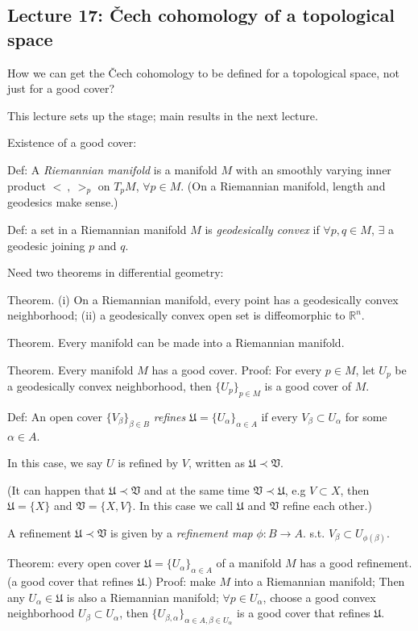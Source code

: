 \documentclass{article}
\theoremstyle{mystyle}
\theoremstyle{remark}
\numberwithin{equation}{section}
\begin{document}
\subsection{Lecture 17: Čech cohomology of a topological space}



How we can get the Čech cohomology to be defined for a topological space, not just for a good cover?

This lecture sets up the stage; main results in the next lecture.

Existence of a good cover: 

Def: 
A \emph{Riemannian manifold} is a manifold $M$ with an smoothly varying inner product $<~,~>_p$ on $T_pM$, $\forall p \in M$. (On a Riemannian manifold, length and geodesics make sense.)

Def: a set in a Riemannian manifold $M$ is \emph{geodesically convex} if $\forall p,q \in M$, $\exists$ a geodesic joining $p$ and $q$.

Need two theorems in differential geometry:

Theorem. (i) On a Riemannian manifold, every point has a geodesically convex neighborhood; (ii) a geodesically convex open set is diffeomorphic to $\mathbb{R}^n$. 

Theorem. Every manifold can be made into a Riemannian manifold.

Theorem. Every manifold $M$ has a good cover. Proof: For every $p\in M$, let $U_p$ be a geodesically convex neighborhood, then $\{U_p\}_{p\in M}$ is a good cover of $M$.

Def: An open cover $\{V_\beta\}_{\beta \in B}$ \emph{refines} $\mathfrak{U} = \{U_\alpha\}_{\alpha \in A}$ if every $V_\beta \subset U_\alpha$ for some $\alpha \in A$. 

In this case, we say $U$ is refined by $V$, written as $\mathfrak{U}\prec \mathfrak{V}$.

(It can happen that $\mathfrak{U}\prec \mathfrak{V}$ and at the same time $\mathfrak{V}\prec \mathfrak{U}$, e.g $V\subset X$, then $\mathfrak{U} = \{X\}$ and $\mathfrak{V} = \{X,V\}$. In this case we call $\mathfrak{U}$ and $\mathfrak{V}$ refine each other.)

A refinement $\mathfrak{U}\prec \mathfrak{V}$ is given by a \emph{refinement map} $\phi\colon B\rightarrow A$. s.t. $V_\beta \subset U_{\phi(\beta)}$. 

Theorem: every open cover $\mathfrak{U}=\{U_\alpha\}_{\alpha \in A}$ of a manifold $M$ has a good refinement. (a good cover that refines $\mathfrak{U}$.) Proof: make $M$ into a Riemannian manifold; Then any $U_\alpha \in \mathfrak{U}$ is also a Riemannian manifold; $\forall p \in U_\alpha$, choose a good convex neighborhood $U_\beta \subset U_\alpha$, then $\{U_{\beta,\alpha}\}_{\alpha \in A,\beta \in U_\alpha}$ is a good cover that refines $\mathfrak{U}$.  
\end{document}
